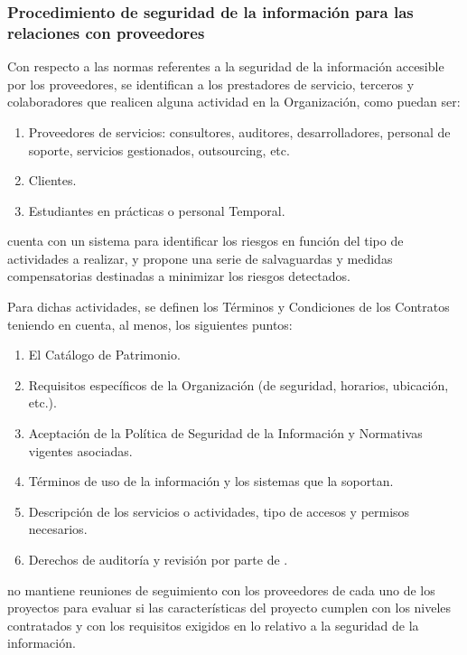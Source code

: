 
\subsubsection{Procedimiento de seguridad de la información para las relaciones con proveedores}

Con respecto a las normas referentes a la seguridad de la información accesible por los proveedores, se identifican a los prestadores de servicio, terceros y colaboradores que realicen alguna actividad en la Organización, como puedan ser:

\begin{enumerate}
    \item Proveedores de servicios: consultores, auditores, desarrolladores, personal de soporte, servicios gestionados, outsourcing, etc.
    \item Clientes.
    \item Estudiantes en prácticas o personal Temporal.
\end{enumerate}

\Beneficiario{} cuenta con un sistema para identificar los riesgos en función del tipo de actividades a realizar, y propone una serie de salvaguardas y medidas compensatorias destinadas a minimizar los riesgos detectados.

Para dichas actividades, se definen los Términos y Condiciones de los Contratos teniendo en cuenta, al menos, los siguientes puntos:

\begin{enumerate}
    \item El Catálogo de Patrimonio.
    \item Requisitos específicos de la Organización (de seguridad, horarios, ubicación, etc.).
    \item Aceptación de la Política de Seguridad de la Información y Normativas vigentes asociadas.
    \item Términos de uso de la información y los sistemas que la soportan.
    \item Descripción de los servicios o actividades, tipo de accesos y permisos necesarios.
    \item Derechos de auditoría y revisión por parte de \Beneficiario{}.
\end{enumerate}

\Beneficiario{} no mantiene reuniones de seguimiento con los proveedores de cada uno de los proyectos para evaluar si las características del proyecto cumplen con los niveles contratados y con los requisitos exigidos en lo relativo a la seguridad de la información.

